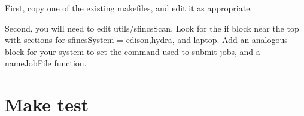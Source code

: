 First, copy one of the existing makefiles, and edit it as appropriate.

Second, you will need to edit {\ttfamily utils/sfincsScan}. Look for the {\ttfamily if} block near the top
with sections for {\ttfamily sfincsSystem = edison},{\ttfamily hydra}, and {\ttfamily laptop}. Add an analogous block
for your system to set the command used to submit jobs, and a {\ttfamily nameJobFile} function.

\section{Make test}

